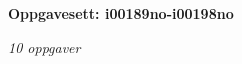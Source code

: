 \centerline{\bf Oppgavesett: i00189no-i00198no}
\vskip 10pt
\centerline{\it 10 oppgaver}\vskip 10pt
\vskip 10pt
